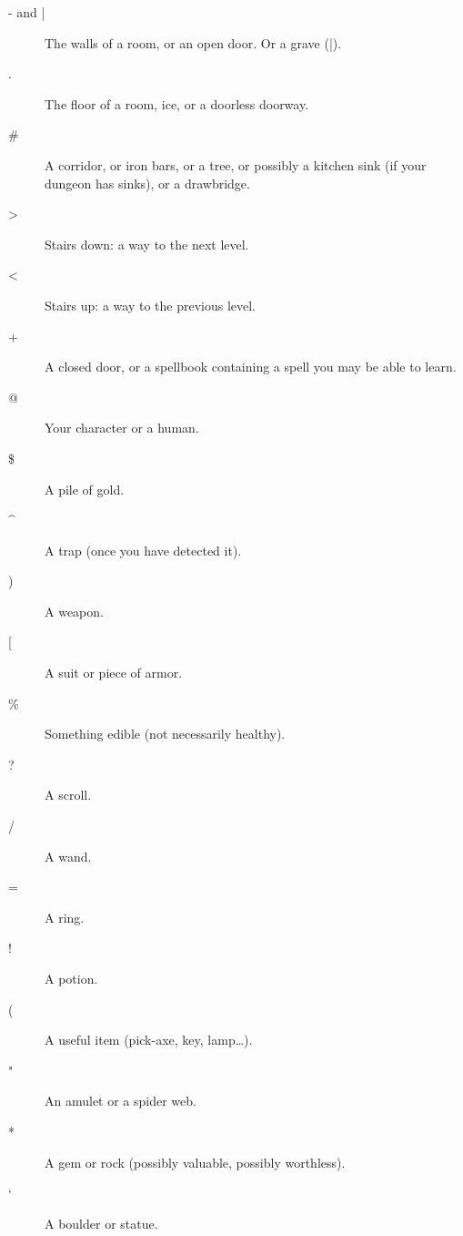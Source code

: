 \documentclass[11pt]{article}
\begin{document}
\begin{description}
\item[{- and |}] The walls of a room, or an open door.  Or a grave (|).

\item[{.}] The floor of a room, ice, or a doorless doorway.

\item[{\#}] A  corridor,  or iron bars, or a tree, or possibly a kitchen
sink (if your dungeon has sinks), or a drawbridge.

\item[{>}] Stairs down: a way to the next level.

\item[{<}] Stairs up: a way to the previous level.

\item[{+}] A closed door, or a spellbook containing a spell you may be
able to learn.

\item[{@}] Your character or a human.

\item[{\$}] A pile of gold.

\item[{\^{}}] A trap (once you have detected it).

\item[{)}] A weapon.

\item[{[}] A suit or piece of armor.

\item[{\%}] Something edible (not necessarily healthy).

\item[{?}] A scroll.

\item[{/}] A wand.

\item[{=}] A ring.

\item[{!}] A potion.

\item[{(}] A useful item (pick-axe, key, lamp\ldots{}).

\item[{"}] An amulet or a spider web.

\item[{*}] A gem or rock (possibly valuable, possibly worthless).

\item[{`}] A boulder or statue.


\end{description}
\end{document}
